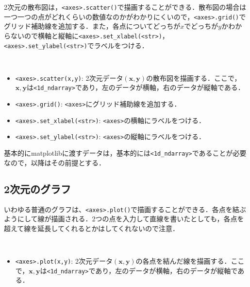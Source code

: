 2次元の散布図は，\texttt{<axes>.scatter()}で描画することができる．散布図の場合は一つ一つの点がどれくらいの数値なのかがわかりにくいので，\texttt{<axes>.grid()}でグリッド補助線を追加する．また，各点についてどっちが$x$でどっちが$y$かわからないので横軸と縦軸に\texttt{<axes>.set\_xlabel(<str>)}，\texttt{<axes>.set\_ylabel(<str>)}でラベルをつける．
\begin{gram}　
\begin{itemize}
\item \texttt{<axes>.scatter(x,y)}: 2次元データ$(\bm{x},\bm{y})$の散布図を描画する．ここで，$\bm{x},\bm{y}$は\texttt{<1d\_ndarray>}であり，左のデータが横軸，右のデータが縦軸である．
\item \texttt{<axes>.grid()}: \texttt{<axes>}にグリッド補助線を追加する．
\item \texttt{<axes>.set\_xlabel(<str>)}: \texttt{<axes>}の横軸にラベルをつける．
\item \texttt{<axes>.set\_ylabel(<str>)}: \texttt{<axes>}の縦軸にラベルをつける．
\end{itemize}
\end{gram}

\begin{rem}
基本的にmatplotlibに渡すデータは，基本的には\texttt{<1d\_ndarray>}であることが必要なので，以降はその前提とする．
\end{rem}

\begin{cod}[\texttt{fig2.py}]　
}]{code/fig2.py}
\vspace{-19pt}
\begin{figure}[H]
\begin{center}
\framed
\texttt{[image: code/fig2.eps]}
\vspace{-10pt}
\caption{\texttt{fig2.eps}}
\endframed
\end{center}
\end{figure}
\end{cod}
\vspace{-20pt}

\subsection{2次元のグラフ}

いわゆる普通のグラフは、\texttt{<axes>.plot()}で描画することができる．各点を結ぶようにして線が描画される．2つの点を入力して直線を書いたとしても，各点を超えて線を延長してくれるとかはしてくれないので注意．
\begin{gram}　
\begin{itemize}
\item \texttt{<axes>.plot(x,y)}: 2次元データ$(\bm{x},\bm{y})$の各点を結んだ線を描画する．ここで，$\bm{x},\bm{y}$は\texttt{<1d\_ndarray>}であり，左のデータが横軸，右のデータが縦軸である．
\end{itemize}
\end{gram}


